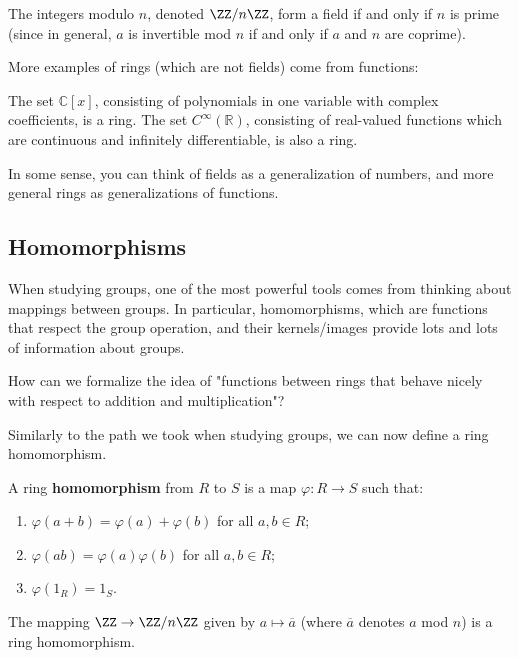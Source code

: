 \begin{example}
The integers modulo $n$, denoted $\ZZ/n\ZZ$, form a field if and only if $n$ is prime (since in general, $a$ is invertible mod $n$ if and only if $a$ and $n$ are coprime). 
\end{example}

More examples of rings (which are not fields) come from functions:

\begin{example}
    The set $\mathbb{C}[x]$, consisting of polynomials in one variable with complex coefficients, is a ring. The set $C^\infty(\mathbb{R})$, consisting of real-valued functions which are continuous and infinitely differentiable, is also a ring. 
\end{example}

In some sense, you can think of fields as a generalization of numbers, and more general rings as generalizations of functions. 

\subsection{Homomorphisms}

When studying groups, one of the most powerful tools comes from thinking about mappings between groups. In particular, homomorphisms, which are functions that respect the group operation, and their kernels/images provide lots and lots of information about groups. 

\begin{qq}
How can we formalize the idea of "functions between rings that behave nicely with respect to addition and multiplication"?
\end{qq}

Similarly to the path we took when studying groups, we can now define a ring homomorphism.

 \begin{definition}
 A ring \textbf{homomorphism} from $R$ to $S$ is a map $\varphi: R \to S$ such that:
 \begin{enumerate}
     \item $\varphi(a+b) = \varphi(a) + \varphi(b)$ for all $a, b \in R$;
     \item $\varphi(ab) = \varphi(a)\varphi(b)$ for all $a, b \in R$;
     \item $\varphi(1_R) = 1_S.$
 \end{enumerate}
 \end{definition}
 
 \begin{example}
The mapping $\ZZ \to \ZZ/n\ZZ$ given by $a \mapsto \overline{a}$ (where $\overline{a}$ denotes $a$ mod $n$) is a ring homomorphism.
\end{example}

